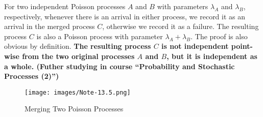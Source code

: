 \documentclass[device=normal, lang=en]{elegantbook}
\numberwithin{equation}{section}
\begin{document}
For two independent Poisson processes $A$ and $B$ with parameters $\lambda_A$ and $\lambda_B$, respectively, whenever there is an arrival in either process, we record it as an arrival in the merged process $C$, otherwise we record it as a failure. The resulting process $C$ is also a Poisson process with parameter $\lambda_A + \lambda_B$. The proof is also obvious by definition. \textbf{The resulting process $C$ is not independent point-wise from the two original processes $A$ and $B$, but it is independent as a whole. (Futher studying in course ``Probability and Stochastic Processes (2)'')}
\begin{figure}[H]
    \centering
    \texttt{[image: images/Note-13.5.png]}
    \caption{Merging Two Poisson Processes}
\end{figure}

\appendix

\end{document}
